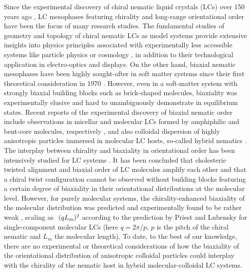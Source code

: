 Since the experimental discovery of chiral nematic liquid crystals (LCs) over 150 years ago \cite{planer1861notiz,reinitzer1888beitrage}, LC mesophases featuring chirality and long-range orientational order have been the focus of many research studies. The fundamental studies of geometry and topology of chiral nematic LCs as model systems provide extensive insights into physics principles associated with experimentally less accessible systems like particle physics or cosmology \cite{wu2022hopfions}, in addition to their technological application in electro-optics and displays. On the other hand, biaxial nematic mesophases have been highly sought-after in soft matter systems since their first theoretical consideration in 1970 \cite{freiser1970ordered}. However, even in a soft-matter system with strongly biaxial building blocks such as brick-shaped molecules, biaxiality was experimentally elusive and hard to unambiguously demonstrate in equilibrium states. Recent reports of the experimental discovery of biaxial nematic order include observations in micellar and molecular LCs formed by amphiphilic and bent-core molecules, respectively \cite{yu1980observation,tschierske2010biaxial}, and also colloidal dispersion of highly anisotropic particles immersed in molecular LC hosts, so-called hybrid nematics \cite{liu2016,mundoor2021,mundoor2018}.
The interplay between chirality and biaxiality in orientational order has been intensively studied for LC systems \cite{priest1974biaxial,kroin1989chirality,bunning1986effect,harris1997microscopic,dussi2016entropy,dhakal2011chirality,longa1994biaxiality,canevari2015biaxiality}. It has been concluded that cholesteric twisted alignment and biaxial order of LC molecules amplify each other and that a chiral twist configuration cannot be observed without building blocks featuring a certain degree of biaxiality in their orientational distributions at the molecular level. However, for purely molecular systems, the chirality-enhanced biaxiality of the molecular distribution was predicted and experimentally found to be rather weak \cite{priest1974biaxial,kroin1989chirality,bunning1986effect,harris1997microscopic,dussi2016entropy,dhakal2011chirality,longa1994biaxiality,canevari2015biaxiality}, scaling as $\ (qL_{\rm m})^2$ according to the prediction by Priest and Lubensky for single-component molecular LCs \cite{priest1974biaxial} (here $q=2\pi/p$, $p$ is the pitch of the chiral nematic and $L_m$ the molecular length). To date, to the best of our knowledge, there are no experimental or theoretical considerations of how the biaxiality of the orientational distribution of anisotropic colloidal particles could interplay with the chirality of the nematic host in hybrid molecular-colloidal LC systems.  



